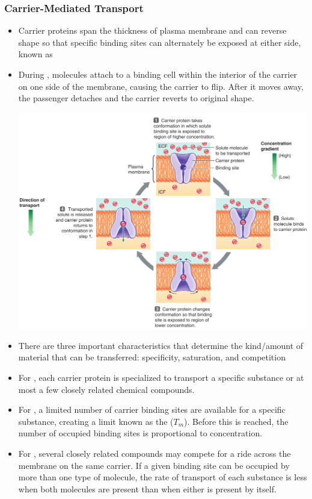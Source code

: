 \documentclass{article}
\numberwithin{equation}{section}
\begin{document}
\subsubsection{Carrier-Mediated Transport}
\begin{itemize}
    \item Carrier proteins span the thickness of plasma membrane and can reverse shape so that specific binding sites can alternately be exposed at either side, known as 
    \item During , molecules attach to a binding cell within the interior of the carrier on one side of the membrane, causing the carrier to flip. After it moves away, the passenger detaches and the carrier reverts to original shape.
    \begin{center}
        \includegraphics[width=0.8\linewidth]{figures/carrier_transport.png}
    \end{center}
    \item There are three important characteristics that determine the kind/amount of material that can be transferred: specificity, saturation, and competition
    \item For , each carrier protein is specialized to transport a specific substance or at most a few closely related chemical compounds.
    \item For , a limited number of carrier binding sites are available for a specific substance, creating a limit known as the  ($T_m$). Before this is reached, the number of occupied binding sites is proportional to concentration.
    \item For , several closely related compounds may compete for a ride across the membrane on the same carrier. If a given binding site can be occupied by more than one type of molecule, the rate of transport of each substance is less when both molecules are present than when either is present by itself.
\end{itemize}
\end{document}
